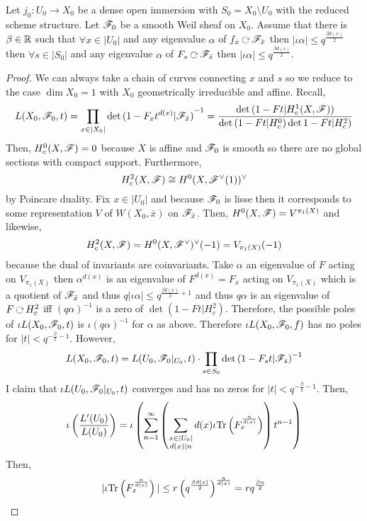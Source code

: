 \documentclass[12pt]{article}
\begin{document}
\begin{theorem}
Let $j_0 : U_0 \to X_0$ be a dense open immersion with $S_0 = X_0 \setminus U_0$ with the reduced scheme structure. Let $\mathscr{F}_0$ be a smooth Weil sheaf on $X_0$. Assume that there is $\beta \in \mathbb{R}$ such that $\forall x \in |U_0|$ and any eigenvalue $\alpha$ of $f_x \acts \F_{\bar{x}}$ then $|\iota \alpha| \le q^{\frac{\beta d(x)}{2}}$ then $\forall s \in |S_0|$ and any eigenvalue $\alpha$ of $F_s \acts \F_{\bar{s}}$ then $|\iota \alpha| \le q^{\frac{\beta d(s)}{2}}$.  
\end{theorem}

\begin{proof}
We can always take a chain of curves connecting $x$ and $s$ so we reduce to the case $\dim{X_0} = 1$ with $X_0$ geometrically irreducible and affine. Recall,
\[ L(X_0, \mathscr{F}_0, t) = \prod_{x \in |X_0|} \det{(1 - F_x t^{d(x)} | \mathscr{F}_{\bar{x}})}^{-1} = \frac{\det{(1 - F t | H^1_c(X, \mathscr{F}))}}{\det{(1 - F t | H^0_c)} \det{1 - Ft | H^2_c)}} \]
Then, $H^0_c(X, \mathscr{F}) = 0$ because $X$ is affine and $\mathscr{F}_0$ is smooth so there are no global sections with compact support. Furthermore,
\[ H^2_c(X, \mathscr{F}) \cong H^0(X, \mathscr{F}^\vee(1))^\vee \] by Poincare duality. Fix $x \in |U_0|$ and because $\mathscr{F}_0$ is lisse then it corresponds to some representation $V$ of $W(X_0, \bar{x})$ on $\mathscr{F}_{\bar{x}}$. Then, $H^0(X, \mathscr{F}) = V^{\pi_1(X)}$ and likewise,
\[ H^2_c(X, \mathscr{F}) = H^0(X, \mathscr{F}^\vee)^\vee(-1) = V_{\pi_1(X)}(-1) \]
because the dual of invariants are coinvariants. Take $\alpha$ an eigenvalue of $F$ acting on $V_{\pi_1(X)}$ then $\alpha^{d(x)}$ is an eigenvalue of $F^{d(x)} = F_x$ acting on $V_{\pi_1(X)}$ which is a quotient of $\mathscr{F}_{\bar{x}}$ and thus $q | \iota \alpha| \le q^{\frac{\beta d(x)}{2} + 1}$ and thus $q \alpha$ is an eigenvalue of $F \acts H^2_c$ iff $(q \alpha)^{-1}$ is a zero of $\det{(1 - F t | H^2_c)}$. Therefore, the possible poles of $\iota L(X_0, \mathscr{F}_0, t)$ is $\iota(q \alpha)^{-1}$ for $\alpha$ as above. Therefore $\iota L(X_0, \mathscr{F}_0, f)$ has no poles for $|t| < q^{-\frac{\beta}{2} - 1}$. However, 
\[ L(X_0, \mathscr{F}_0, t) = L(U_0, \mathscr{F}_0 |_{U_0}, t) \cdot \prod_{s \in S_0} \det{(1 - F_s t | \mathscr{F}_{\bar{s}})}^{-1} \]
I claim that $\iota L(U_0, \mathscr{F}_0 |_{U_0}, t)$ converges and has no zeros for $|t| < q^{-\frac{\beta}{2} - 1}$. Then,
\[ \iota \left( \frac{L'(U_0)}{L(U_0)} \right) = \iota\left( \sum_{n = 1}^\infty \left( \sum_{\substack{x \in |U_0| \\ d(x) \mid n}} d(x) \iota \mathrm{Tr}\left( F_x^{\frac{n}{d(x)}} \right) \right) t^{n-1} \right) \]
Then, 
\[ | \iota \mathrm{Tr}\left( F_x^{\frac{n}{d(x)}} \right) | \le r \left( q^{\frac{\beta d(x)}{2}} \right)^{\frac{n}{d(x)}} = r q^{\frac{\beta n}{2}} \]

\end{proof}
\end{document}
